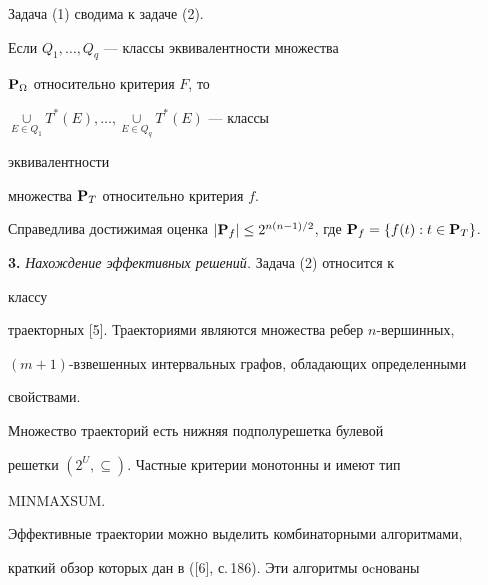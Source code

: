 \begin{cor} 


Задача (1) сводима к задаче (2). 


\end{cor} 


 


\begin{cor} 


Если $Q_1,\dotsc,Q_q$ --- классы эквивалентности множества 


$\bold P_\Omega$ относительно критерия $F$, то 


$\mathop{\cup}\limits_{E\in Q_1}T^*(E),\dotsc, 


\mathop{\cup}\limits_{E\in Q_q}T^*(E)$ --- классы 


эквивалентности 


множества $\bold P_T$ относительно критерия $f$. 


\end{cor} 


 


\begin{cor} 


Справедлива достижимая оценка $|\bold P_f|\le2^{n(n-1)/2}$, где $\bold 


P_f=\{f(t):t\in\bold P_T\}$. 


\end{cor} 


 


{\bf 3.} {\it Нахождение эффективных решений.} Задача (2) относится к 


классу 


траекторных [5]. Траекториями являются множества ребер $n$-вершинных, 


$(m+1)$-взвешенных интервальных графов, обладающих определенными 


свойствами. 


Множество траекторий есть нижняя подполурешетка булевой 


решетки $(2^U,\subseteq)$. Частные критерии монотонны и имеют тип 


MINMAXSUM. 


 


Эффективные траектории можно выделить комбинаторными алгоритмами, 


краткий обзор которых дан в ([6], с.\,186). Эти алгоритмы оcнованы 


